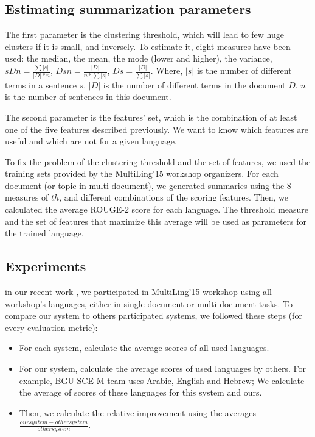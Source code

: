 \documentclass{LCSI_PhD}
\begin{document}
\subsection{Estimating summarization parameters}

The first parameter is the clustering threshold, which will lead to few huge clusters if it is small, and inversely.
To estimate it, eight measures have been used:
the median, the mean, the mode (lower and higher), the variance, $ sDn = \frac{\sum |s|}{|D| * n}$, 
$ Dsn = \frac{|D|}{n * \sum |s|}$,  $ Ds = \frac{|D|}{\sum |s|}$.
Where, $|s|$ is the number of different terms in a sentence $s$. 
$|D|$ is the number of different terms in the document $D$.
$n$ is the number of sentences in this document.

The second parameter is the features' set, which is the combination of at least one of the five features described previously. 
We want to know which features are useful and which are not for a given language.

To fix the problem of the clustering threshold and the set of features, we used the training sets provided by the MultiLing'15 workshop organizers.
For each document (or topic in multi-document), we generated summaries using the 8 measures of $ th $, and different combinations of the scoring features. 
Then, we calculated the average ROUGE-2 score for each language. 
The threshold measure and the set of features that maximize this average will be used as parameters for the trained language. 

\subsection{Experiments}

in our recent work \cite{15-aries-al}, we participated in MultiLing'15 workshop using all workshop's languages, either in single document or multi-document tasks.
To compare our system to others participated systems, we followed these steps (for every evaluation metric): 
\begin{itemize}
\item For each system, calculate the average scores of all used languages.
\item For our system, calculate the average scores of used languages by others. 
For example, BGU-SCE-M team uses Arabic, English and Hebrew; 
We calculate the average of scores of these languages for this system and ours.
\item Then, we calculate the relative improvement using the averages $ \frac{our system - other system}{other system} $.
\end{itemize}
\end{document}
